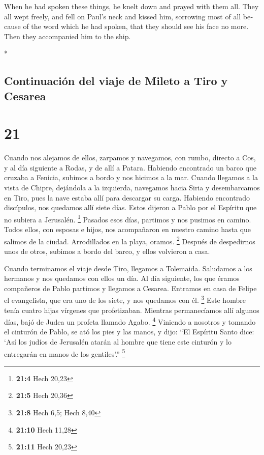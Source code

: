 \begin{paracol}{2}
\begin{otherlanguage}{english}
 When he had spoken these things, he knelt down and
prayed with them all.  They all wept freely, and fell on
Paul's neck and kissed him,  sorrowing most of all
because of the word which he had spoken, that they should see his face
no more. Then they accompanied him to the ship.

\end{otherlanguage}

\switchcolumn[0]*

\hypertarget{continuaciuxf3n-del-viaje-de-mileto-a-tiro-y-cesarea}{%
\subsection{Continuación del viaje de Mileto a Tiro y
Cesarea}\label{continuaciuxf3n-del-viaje-de-mileto-a-tiro-y-cesarea}}

\hypertarget{section-40}{%
\section{21}\label{section-40}}

 Cuando nos alejamos de ellos, zarpamos y navegamos, con
rumbo, directo a Cos, y al día siguiente a Rodas, y de allí a Patara.
 Habiendo encontrado un barco que cruzaba a Fenicia,
subimos a bordo y nos hicimos a la mar.  Cuando llegamos a
la vista de Chipre, dejándola a la izquierda, navegamos hacia Siria y
desembarcamos en Tiro, pues la nave estaba allí para descargar su carga.
 Habiendo encontrado discípulos, nos quedamos allí siete
días. Estos dijeron a Pablo por el Espíritu que no subiera a Jerusalén.
\footnote{\textbf{21:4} Hech 20,23}  Pasados esos días,
partimos y nos pusimos en camino. Todos ellos, con esposas e hijos, nos
acompañaron en nuestro camino hasta que salimos de la ciudad.
Arrodillados en la playa, oramos. \footnote{\textbf{21:5} Hech 20,36}
 Después de despedirnos unos de otros, subimos a bordo del
barco, y ellos volvieron a casa.

 Cuando terminamos el viaje desde Tiro, llegamos a
Tolemaida. Saludamos a los hermanos y nos quedamos con ellos un día.
 Al día siguiente, los que éramos compañeros de Pablo
partimos y llegamos a Cesarea. Entramos en casa de Felipe el
evangelista, que era uno de los siete, y nos quedamos con él.
\footnote{\textbf{21:8} Hech 6,5; Hech 8,40}  Este hombre
tenía cuatro hijas vírgenes que profetizaban.  Mientras
permanecíamos allí algunos días, bajó de Judea un profeta llamado Agabo.
\footnote{\textbf{21:10} Hech 11,28}  Viniendo a nosotros
y tomando el cinturón de Pablo, se ató los pies y las manos, y dijo:
``El Espíritu Santo dice: `Así los judíos de Jerusalén atarán al hombre
que tiene este cinturón y lo entregarán en manos de los gentiles'.''
\footnote{\textbf{21:11} Hech 20,23}


\end{paracol}
